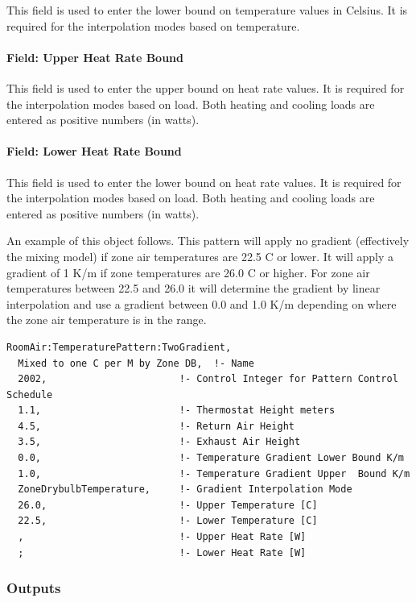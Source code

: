 This field is used to enter the lower bound on temperature values in Celsius. It is required for the interpolation modes based on temperature.

\paragraph{Field: Upper Heat Rate Bound}\label{field-upper-heat-rate-bound}

This field is used to enter the upper bound on heat rate values. It is required for the interpolation modes based on load. Both heating and cooling loads are entered as positive numbers (in watts).

\paragraph{Field: Lower Heat Rate Bound}\label{field-lower-heat-rate-bound}

This field is used to enter the lower bound on heat rate values. It is required for the interpolation modes based on load. Both heating and cooling loads are entered as positive numbers (in watts).

An example of this object follows. This pattern will apply no gradient (effectively the mixing model) if zone air temperatures are 22.5 C or lower. It will apply a gradient of 1 K/m if zone temperatures are 26.0 C or higher. For zone air temperatures between 22.5 and 26.0 it will determine the gradient by linear interpolation and use a gradient between 0.0 and 1.0 K/m depending on where the zone air temperature is in the range.

\begin{lstlisting}
RoomAir:TemperaturePattern:TwoGradient,
  Mixed to one C per M by Zone DB,  !- Name
  2002,                       !- Control Integer for Pattern Control Schedule
  1.1,                        !- Thermostat Height meters
  4.5,                        !- Return Air Height
  3.5,                        !- Exhaust Air Height
  0.0,                        !- Temperature Gradient Lower Bound K/m
  1.0,                        !- Temperature Gradient Upper  Bound K/m
  ZoneDrybulbTemperature,     !- Gradient Interpolation Mode
  26.0,                       !- Upper Temperature [C]
  22.5,                       !- Lower Temperature [C]
  ,                           !- Upper Heat Rate [W]
  ;                           !- Lower Heat Rate [W]
\end{lstlisting}

\subsubsection{Outputs}\label{roomairtemperaturepatterntwogradient-outputs}

